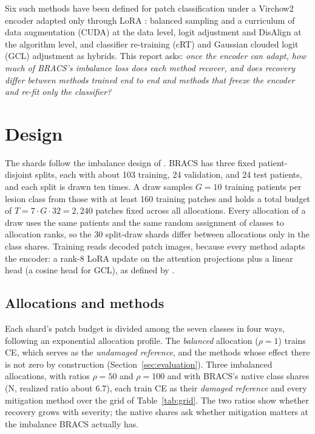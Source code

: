 \documentclass[11pt]{article}
\begin{document}
Six such methods have been defined for patch classification under a Virchow2 encoder adapted only through LoRA \citep{queisler2026mitigationMethods}: balanced sampling and a curriculum of data augmentation (CUDA) at the data level, logit adjustment and DisAlign at the algorithm level, and classifier re-training (cRT) and Gaussian clouded logit (GCL) adjustment as hybrids. This report asks: \emph{once the encoder can adapt, how much of BRACS's imbalance loss does each method recover, and does recovery differ between methods trained end to end and methods that freeze the encoder and re-fit only the classifier?}

\section{Design}
\label{sec:design}
The shards follow the imbalance design of \citet{queisler2026prevalenceBracs}. BRACS has three fixed patient-disjoint splits, each with about 103 training, 24 validation, and 24 test patients, and each split is drawn ten times. A draw samples $G=10$ training patients per lesion class from those with at least 160 training patches and holds a total budget of $T=7\cdot G\cdot 32=2{,}240$ patches fixed across all allocations. Every allocation of a draw uses the same patients and the same random assignment of classes to allocation ranks, so the 30 split-draw shards differ between allocations only in the class shares. Training reads decoded patch images, because every method adapts the encoder: a rank-8 LoRA update on the attention projections plus a linear head (a cosine head for GCL), as defined by \citet{queisler2026mitigationMethods}.

\subsection{Allocations and methods}
Each shard's patch budget is divided among the seven classes in four ways, following an exponential allocation profile. The \emph{balanced} allocation ($\rho=1$) trains CE, which serves as the \emph{undamaged reference}, and the methods whose effect there is not zero by construction (Section~\ref{sec:evaluation}). Three imbalanced allocations, with ratios $\rho=50$ and $\rho=100$ and with BRACS's native class shares (N, realized ratio about 6.7), each train CE as their \emph{damaged reference} and every mitigation method over the grid of Table~\ref{tab:grid}. The two ratios show whether recovery grows with severity; the native shares ask whether mitigation matters at the imbalance BRACS actually has.
\end{document}
